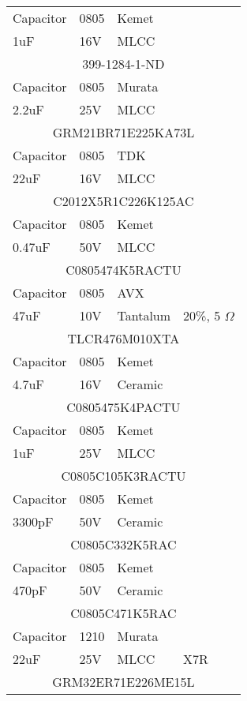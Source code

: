 \documentclass[9pt]{memoir} %
\begin{document}
\vspace{-0.17in}
\hspace{-0.25in}
\begin{tabular}{l l l l }

Capacitor & 0805 & Kemet\\
1uF & 16V & MLCC &  \\
\multicolumn{4}{c}{399-1284-1-ND}\\[\sep]

Capacitor & 0805 & Murata\\
2.2uF & 25V & MLCC &  \\
\multicolumn{4}{c}{GRM21BR71E225KA73L}\\[\jump]

Capacitor & 0805 & TDK\\
22uF & 16V & MLCC &  \\
\multicolumn{4}{c}{C2012X5R1C226K125AC}\\[\jump]

Capacitor & 0805 & Kemet\\
0.47uF & 50V & MLCC &  \\
\multicolumn{4}{c}{C0805474K5RACTU}\\[\jump]

Capacitor & 0805 & AVX\\
47uF & 10V & Tantalum & 20\%, 5 $\Omega$ \\
\multicolumn{4}{c}{TLCR476M010XTA}\\[\jump]

Capacitor & 0805 & Kemet\\
4.7uF & 16V & Ceramic &   \\
\multicolumn{4}{c}{C0805475K4PACTU}\\[\jump]

Capacitor & 0805 & Kemet\\
1uF & 25V & MLCC &  \\
\multicolumn{4}{c}{C0805C105K3RACTU}\\[\jump]

Capacitor & 0805 & Kemet\\
3300pF & 50V & Ceramic &   \\
\multicolumn{4}{c}{C0805C332K5RAC}\\[\jump]

Capacitor & 0805 & Kemet\\
470pF & 50V & Ceramic &   \\
\multicolumn{4}{c}{C0805C471K5RAC}\\[\jump]

Capacitor & 1210 & Murata\\
22uF & 25V & MLCC & X7R  \\
\multicolumn{4}{c}{GRM32ER71E226ME15L}\\[\jump]



\end{tabular}
\end{document}
